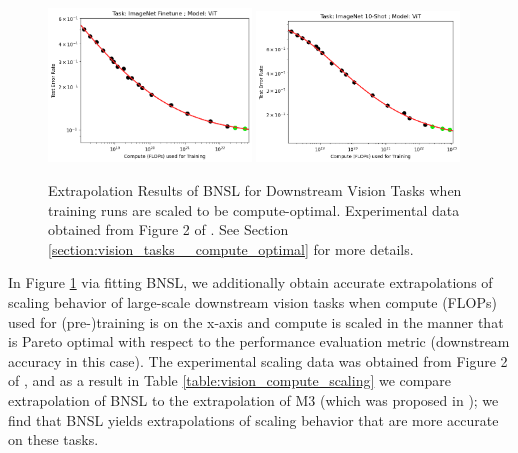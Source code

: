 \documentclass{article} %
\begin{document}
\FloatBarrier

\begin{figure}[htbp]
    \centering
\includegraphics[width=0.48\textwidth]{figures/compute/vision/Task_ImageNet_Finetune__Model_ViT__BNSL.png}
\includegraphics[width=0.48\textwidth]{figures/compute/vision/Task_ImageNet_10-Shot__Model_ViT__BNSL.png}
\vspace{-3.5mm}
    \caption{
Extrapolation Results of BNSL for Downstream Vision Tasks when training runs are scaled to be compute-optimal. Experimental data obtained from Figure 2 of \cite{DBLP:journals/corr/abs-2106-04560}. See Section \ref{section:vision_tasks__compute_optimal} for more details.
    }
    \label{fig:vision_compute_scaling}
\end{figure}

In Figure \ref{fig:vision_compute_scaling} via fitting BNSL, we additionally obtain accurate extrapolations of scaling behavior of large-scale downstream vision tasks when compute (FLOPs) used for (pre-)training is on the x-axis and compute is scaled in the manner that is Pareto optimal with respect to the performance evaluation metric (downstream accuracy in this case). The experimental scaling data was obtained from Figure 2 of \cite{DBLP:journals/corr/abs-2106-04560}, and as a result in Table \ref{table:vision_compute_scaling} we compare extrapolation of BNSL to the extrapolation of M3 (which was proposed in \cite{DBLP:journals/corr/abs-2106-04560}); we find that BNSL yields extrapolations of scaling behavior that are more accurate on these tasks.
\end{document}
